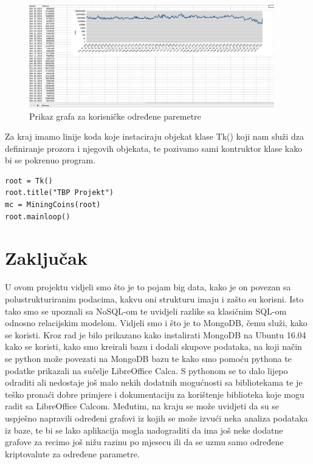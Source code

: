 \documentclass[a4paper,12pt]{foi}
\begin{document}
\begin{figure}[h]
\centering 
\includegraphics[width=0.95\textwidth]{analiza.png}
\caption{Prikaz grafa za korisničke određene paremetre}
\label{slika-8}
\end{figure}


Za kraj imamo linije koda koje instaciraju objekat klase Tk() koji nam služi dza definiranje prozora i njegovih objekata, te pozivamo sami kontruktor klase kako bi se pokrenuo program.


\lstset{commentstyle=\textit,language=python}
\begin{lstlisting}[frame=tb]
root = Tk()
root.title("TBP Projekt")
mc = MiningCoins(root)
root.mainloop()
\end{lstlisting}


\chapter{Zaključak}
U ovom projektu vidjeli smo što je to pojam big data, kako je on povezan sa polustrukturiranim podacima, kakvu oni strukturu imaju i zašto su korisni. Isto tako smo se upoznali sa NoSQL-om te uvidjeli razlike sa klasičnim SQL-om odnosno relacijskim modelom. Vidjeli smo i što je to MongoDB, čemu služi, kako se koristi. Kroz rad je bilo prikazano kako instalirati MongoDB na Ubuntu 16.04 kako se koristi, kako smo kreirali bazu i dodali skupove podataka, na koji način se python može povezati na MongoDB bazu te kako smo pomoću pythona te podatke prikazali na sučelje LibreOffice Calca. S pythonom se to dalo lijepo odraditi ali nedostaje još malo nekih dodatnih mogućnosti sa bibliotekama te je teško pronaći dobre primjere i dokumentaciju za korištenje biblioteka koje mogu radit sa LibreOffice Calcom. Međutim, na kraju se može uvidjeti da su se uspješno napravili određeni grafovi iz kojih se može izvući neka analiza podataka iz baze, te bi se lako aplikacija mogla nadograditi da ima još neke dodatne grafove za recimo još nižu razinu po mjesecu ili da se uzmu samo određene kriptovalute za određene parametre. 


\end{document}

